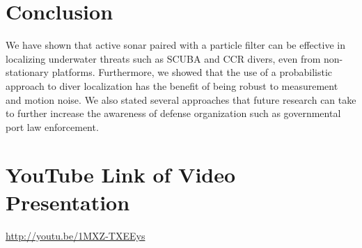 \documentclass{article} %
\begin{document}
\section{Conclusion}
We have shown that active sonar paired with a particle filter can be effective in localizing underwater threats such as SCUBA and CCR divers, even from non-stationary platforms. Furthermore, we showed that the use of a probabilistic approach to diver localization has the benefit of being robust to measurement and motion noise. We also stated several approaches that future research can take to further increase the awareness of defense organization such as governmental port law enforcement.

\section*{YouTube Link of Video Presentation}
\url{http://youtu.be/1MXZ-TXEEys}
\end{document}
